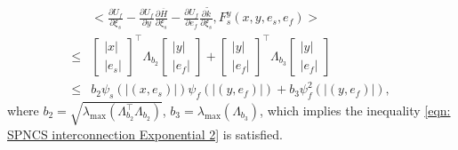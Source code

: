 \begin{equation}
    \begin{aligned}
        &\Big< \tfrac{\partial {U_f}}{\partial \xi_s} - \tfrac{\partial {U_f}}{\partial y} \tfrac{\partial \overline{H}}{\partial \xi_s} - \tfrac{\partial {U_f}}{\partial e_f} \tfrac{\partial \tilde k}{\partial \xi_s} ,  F_s^y(x,y,e_s,e_f) \Big>
        \\
        \leq & \left[ \begin{smallmatrix}
            |x| \\ |e_s|
        \end{smallmatrix} \right]^\top
        \Lambda_{b_2}
        \left[ \begin{smallmatrix}
            |y| \\ |e_f|
        \end{smallmatrix} \right]
        + 
        \left[ \begin{smallmatrix}
        |y| \\ |e_f|
        \end{smallmatrix} \right]^\top
        \Lambda_{b_3}
        \left[ \begin{smallmatrix}
            |y| \\ |e_f|
        \end{smallmatrix} \right]
        \\
        \leq &  b_2 \psi_s\left(\left| (x, e_s) \right|\right) \psi_f\left(\left| (y, e_f) \right|\right) + b_3 \psi_f^2\left(\left| (y, e_f) \right|\right),
    \end{aligned}
    \label{eqn: Lambda_b2 and Lambda_b3}
\end{equation}
where $b_2 \!= \! \sqrt{\lambda_{\text{max}}(\Lambda_{b_2}^\top \Lambda_{b_2}) }$, $b_3 = \lambda_{\text{max}}(\Lambda_{b_3})$, which implies the inequality \eqref{eqn: SPNCS interconnection Exponential 2} is satisfied. 

